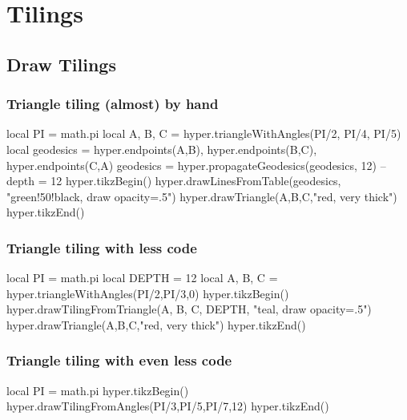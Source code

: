 \documentclass{article}
\begin{document}
\newpage

\section{Tilings}

\subsection{Draw Tilings}

\subsubsection{Triangle tiling (almost) by hand}
\begin{codeandresult}
\begin{luacode*}
local PI = math.pi
local A, B, C = hyper.triangleWithAngles(PI/2, PI/4, PI/5)
local geodesics = {
	{hyper.endpoints(A,B)},
	{hyper.endpoints(B,C)},
	{hyper.endpoints(C,A)}
}
geodesics = hyper.propagateGeodesics(geodesics, 12) -- depth = 12
hyper.tikzBegin()
hyper.drawLinesFromTable(geodesics, "green!50!black, draw opacity=.5")
hyper.drawTriangle(A,B,C,"red, very thick")
hyper.tikzEnd()
\end{luacode*}
\end{codeandresult}

\subsubsection{Triangle tiling with less code}
\begin{codeandresult}
\begin{luacode*}
local PI = math.pi
local DEPTH = 12
local A, B, C = hyper.triangleWithAngles(PI/2,PI/3,0)
hyper.tikzBegin()
hyper.drawTilingFromTriangle(A, B, C, DEPTH, "teal, draw opacity=.5")
hyper.drawTriangle(A,B,C,"red, very thick")
hyper.tikzEnd()
\end{luacode*}
\end{codeandresult}


\subsubsection{Triangle tiling with even less code}
\begin{codeandresult}
\begin{luacode*}
local PI = math.pi
hyper.tikzBegin()
hyper.drawTilingFromAngles(PI/3,PI/5,PI/7,12)
hyper.tikzEnd()
\end{luacode*}
\end{codeandresult}
\end{document}
